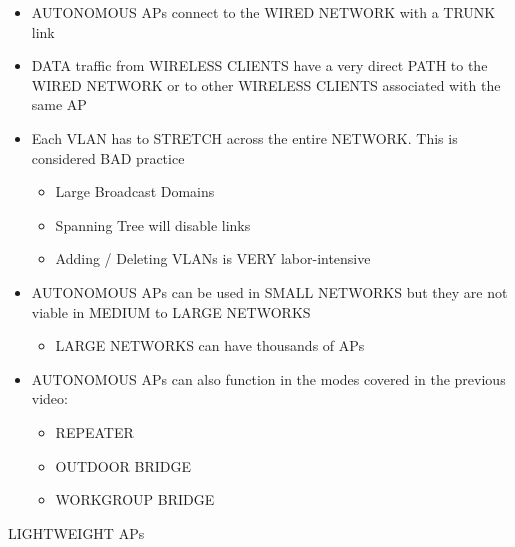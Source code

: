 \begin{itemize}
\tightlist
\item
  AUTONOMOUS APs connect to the WIRED NETWORK with a TRUNK link
\item
  DATA traffic from WIRELESS CLIENTS have a very direct PATH to the
  WIRED NETWORK or to other WIRELESS CLIENTS associated with the same AP
\item
  Each VLAN has to STRETCH across the entire NETWORK. This is considered
  BAD practice

  \begin{itemize}
  \tightlist
  \item
    Large Broadcast Domains
  \item
    Spanning Tree will disable links
  \item
    Adding / Deleting VLANs is VERY labor-intensive
  \end{itemize}
\item
  AUTONOMOUS APs can be used in SMALL NETWORKS but they are not viable
  in MEDIUM to LARGE NETWORKS

  \begin{itemize}
  \tightlist
  \item
    LARGE NETWORKS can have thousands of APs
  \end{itemize}
\item
  AUTONOMOUS APs can also function in the modes covered in the previous
  video:

  \begin{itemize}
  \tightlist
  \item
    REPEATER
  \item
    OUTDOOR BRIDGE
  \item
    WORKGROUP BRIDGE
  \end{itemize}
\end{itemize}

LIGHTWEIGHT APs

